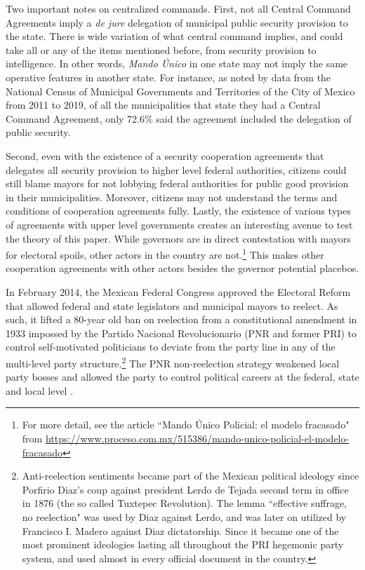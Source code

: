 \documentclass[12pt]{amsart}
\makeatletter
\def\section{\@startsection{section}{1}
	\z@{1.0\linespacing\@plus\linespacing}{.5\linespacing}{\Large}}
\numberwithin{equation}{section}
\theoremstyle{definition}
\theoremstyle{definition}
\theoremstyle{definition}
\makeatother
\begin{document}
Two important notes on centralized commands. First, not all Central Command Agreements imply a \emph{de jure} delegation of municipal public security provision to the state. There is wide variation of what central command implies, and could take all or any of the items mentioned before, from security provision to intelligence. In other words, \emph{Mando \'Unico} in one state may not imply the same operative features in another state.  %
For instance, as noted by data from the National Census of Municipal Governments and Territories of the City of Mexico from 2011 to 2019, of all the municipalities that state they had a Central Command Agreement, only 72.6\% said the agreement included the delegation of public security.

Second, even with the existence of a security cooperation agreements that delegates all security provision to higher level federal authorities, citizens could still blame mayors for not lobbying federal authorities for public good provision in their municipalities. Moreover, citizens may not understand the terms and conditions of cooperation agreements fully. Lastly, the existence of various types of agreements with upper level governments creates an interesting avenue to test the theory of this paper. While governors are in direct contestation with mayors for electoral spoils, other actors in the country are not.\footnote{For more detail, see the article ``Mando \'Unico Policial: el modelo fracasado" from \url{https://www.proceso.com.mx/515386/mando-unico-policial-el-modelo-fracasado}} This makes other cooperation agreements with other actors besides the governor potential placebos.   

\section{Term Limit Reform of 2014 \label{sec:reform}}   
       
In February 2014, the Mexican Federal Congress approved the Electoral Reform that allowed federal and state legislators and municipal mayors to reelect. As such, it lifted a 80-year old ban on reelection from a constitutional amendment in 1933 impossed by the Partido Nacional Revolucionario (PNR and former PRI) to control self-motivated politicians to deviate from the party line in any of the multi-level party structure.\footnote{Anti-reelection sentiments became part of the Mexican political ideology since Porfirio Diaz's coup against president Lerdo de Tejada second term in office in 1876 (the so called Tuxtepec Revolution). The lemma ``effective suffrage, no reelection" was used by Diaz against Lerdo, and was later on utilized by Francisco I. Madero against Diaz dictatorship. Since it became one of the most prominent ideologies lasting all throughout the PRI hegemonic party system, and used almost in every official document in the country.} The PNR non-reelection strategy weakened local party bosses and allowed the party to control political careers at the federal, state and local level \citep{weldon_2003}. 
\end{document}

